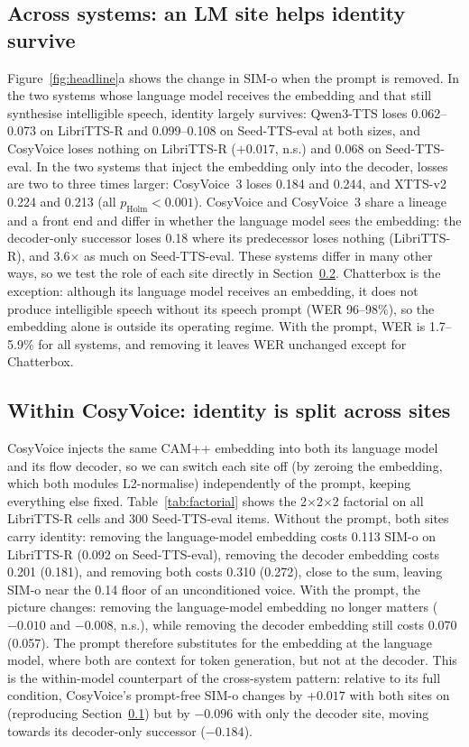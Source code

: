 \documentclass{Interspeech}
\begin{document}
\subsection{Across systems: an LM site helps identity survive}
\label{sec:identity}

Figure~\ref{fig:headline}a shows the change in SIM-o when the prompt is removed.
In the two systems whose language model receives the embedding and that still synthesise intelligible speech, identity largely survives: Qwen3-TTS loses 0.062--0.073 on LibriTTS-R and 0.099--0.108 on Seed-TTS-eval at both sizes, and CosyVoice loses nothing on LibriTTS-R ($+0.017$, n.s.) and 0.068 on Seed-TTS-eval.
In the two systems that inject the embedding only into the decoder, losses are two to three times larger: CosyVoice~3 loses 0.184 and 0.244, and XTTS-v2 0.224 and 0.213 (all $p_\text{Holm}{<}0.001$).
CosyVoice and CosyVoice~3 share a lineage and a front end and differ in whether the language model sees the embedding: the decoder-only successor loses 0.18 where its predecessor loses nothing (LibriTTS-R), and 3.6$\times$ as much on Seed-TTS-eval.
These systems differ in many other ways, so we test the role of each site directly in Section~\ref{sec:factorial}.
Chatterbox is the exception: although its language model receives an embedding, it does not produce intelligible speech without its speech prompt (WER 96--98\%), so the embedding alone is outside its operating regime.
With the prompt, WER is 1.7--5.9\% for all systems, and removing it leaves WER unchanged except for Chatterbox.

\subsection{Within CosyVoice: identity is split across sites}
\label{sec:factorial}

CosyVoice injects the same CAM++ embedding into both its language model and its flow decoder, so we can switch each site off (by zeroing the embedding, which both modules L2-normalise) independently of the prompt, keeping everything else fixed.
Table~\ref{tab:factorial} shows the 2$\times$2$\times$2 factorial on all LibriTTS-R cells and 300 Seed-TTS-eval items.
Without the prompt, both sites carry identity: removing the language-model embedding costs 0.113 SIM-o on LibriTTS-R (0.092 on Seed-TTS-eval), removing the decoder embedding costs 0.201 (0.181), and removing both costs 0.310 (0.272), close to the sum, leaving SIM-o near the 0.14 floor of an unconditioned voice.
With the prompt, the picture changes: removing the language-model embedding no longer matters ($-0.010$ and $-0.008$, n.s.), while removing the decoder embedding still costs 0.070 (0.057).
The prompt therefore substitutes for the embedding at the language model, where both are context for token generation, but not at the decoder.
This is the within-model counterpart of the cross-system pattern: relative to its full condition, CosyVoice's prompt-free SIM-o changes by $+0.017$ with both sites on (reproducing Section~\ref{sec:identity}) but by $-0.096$ with only the decoder site, moving towards its decoder-only successor ($-0.184$).
\end{document}
